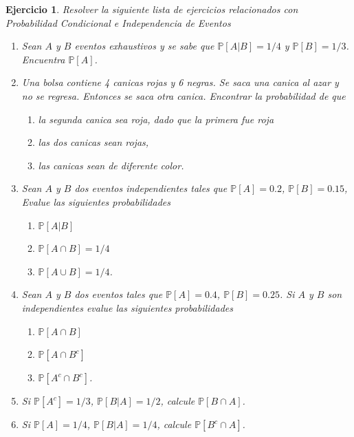 \documentclass[12pt,twoside]{article}
\newtheorem{Ejer}{Ejercicio}
\newcommand{\Prob}{\mathbb{P}}
\begin{document}
\begin{Ejer} Resolver la siguiente lista de ejercicios relacionados con Probabilidad Condicional e Independencia de Eventos
\begin{enumerate}

\item Sean $A$ y $B$ eventos exhaustivos y se sabe que $\Prob\left[A|B\right]=1/4$ y $\Prob\left[B\right]=1/3$. Encuentra $\Prob\left[A\right]$.

\item Una bolsa contiene 4 canicas rojas y 6 negras. Se saca una canica al azar y no se regresa. Entonces se saca otra canica. Encontrar la probabilidad de que
\begin{enumerate}
\item la segunda canica sea roja, dado que la primera fue roja
\item las dos canicas sean rojas,
\item las canicas sean de diferente color.
\end{enumerate}

\item Sean $A$ y $B$ dos eventos independientes tales que $\Prob\left[A\right]=0.2$, $\Prob\left[B\right]=0.15$, Evalue las siguientes probabilidades
\begin{enumerate}
\item $\Prob\left[A|B\right]$
\item $\Prob\left[A\cap B\right]=1/4$
\item $\Prob\left[A\cup B\right]=1/4$.
\end{enumerate}

\item Sean $A$ y $B$ dos eventos tales que $\Prob\left[A\right]=0.4$, $\Prob\left[B\right]=0.25$. Si $A$ y $B$ son independientes evalue las siguientes probabilidades
\begin{enumerate}
\item $\Prob\left[A\cap B\right]$
\item $\Prob\left[A\cap B^{c}\right]$
\item $\Prob\left[A^{c}\cap B^{c}\right]$.
\end{enumerate}
	
\item Si $\Prob\left[A^{c}\right]=1/3$, $\Prob\left[B|A\right]=1/2$, calcule $\Prob\left[B\cap A\right]$.

\item Si $\Prob\left[A\right]=1/4$, $\Prob\left[B|A\right]=1/4$, calcule $\Prob\left[B^{c}\cap A\right]$.


\end{enumerate}
\end{Ejer}
\end{document}
